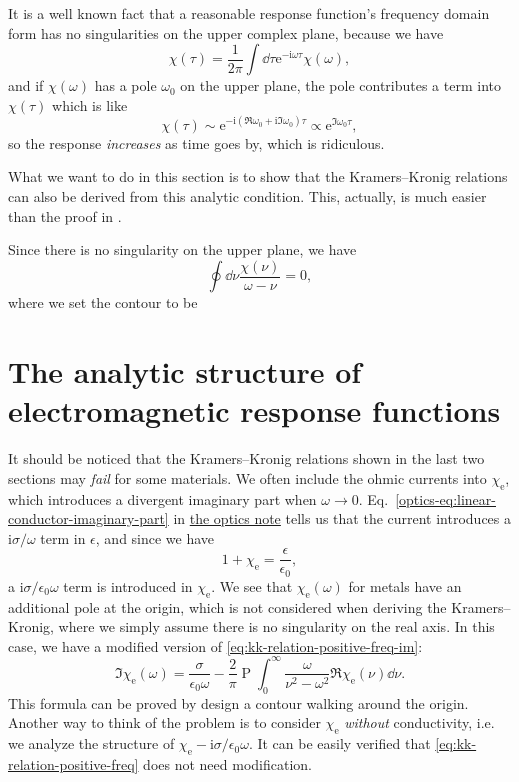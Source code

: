 \documentclass[hyperref, a4paper]{article}
\DeclareMathOperator{\primevalue}{P}
\newcommand*{\ii}{\mathrm{i}}
\newcommand*{\ee}{\mathrm{e}}
\newcommand{\opticsdoc}{\href{../optics/optics}{the optics note}}
\begin{document}
It is a well known fact that a reasonable response function's frequency domain form has no singularities on the upper complex plane, because we have 
\[
    \chi(\tau) = \frac{1}{2\pi} \int \dd{\tau} \ee^{- \ii \omega \tau} \chi(\omega),
\]
and if $\chi(\omega)$ has a pole $\omega_0$ on the upper plane, the pole contributes a term into $\chi(\tau)$ which is like 
\[
    \chi(\tau) \sim \ee^{- \ii (\Re \omega_0 + \ii \Im \omega_0) \tau} \propto \ee^{\Im \omega_0 \tau},
\]
so the response \emph{increases} as time goes by, which is ridiculous.

What we want to do in this section is to show that the Kramers–Kronig relations can also be derived from this analytic condition.
This, actually, is much easier than the proof in .

Since there is no singularity on the upper plane, we have 
\[
    \oint \dd{\nu} \frac{\chi(\nu)}{\omega - \nu} = 0,
\]
where we set the contour to be 

\section{The analytic structure of electromagnetic response functions}

It should be noticed that the Kramers–Kronig relations shown in the last two sections may \emph{fail} for some materials.
We often include the ohmic currents into $\chi_\text{e}$, which introduces a divergent imaginary part when $\omega \to 0$.
Eq.~\eqref{optics-eq:linear-conductor-imaginary-part} in \opticsdoc{} tells us that the current introduces a $\ii \sigma / \omega$ term in $\epsilon$, and since we have 
\begin{equation}
    1 + \chi_\text{e} = \frac{\epsilon}{\epsilon_0},
\end{equation}
a $\ii \sigma / \epsilon_0 \omega$ term is introduced in $\chi_\text{e}$.
We see that $\chi_\text{e}(\omega)$ for metals have an additional pole at the origin, which is not considered when deriving the Kramers–Kronig, where we simply assume there is no singularity on the real axis.
In this case, we have a modified version of \eqref{eq:kk-relation-positive-freq-im}:
\begin{equation}
    \Im \chi_\text{e}(\omega) = \frac{\sigma}{\epsilon_0 \omega} - \frac{2}{\pi} \primevalue \int_0^\infty \frac{\omega}{\nu^2 - \omega^2} \Re \chi_\text{e}(\nu) \dd{\nu}.
    \label{eq:metal-kk-relation}
\end{equation}
This formula can be proved by design a contour walking around the origin.
Another way to think of the problem is to consider $\chi_\text{e}$ \emph{without} conductivity, i.e. we analyze the structure of $\chi_\text{e} - \ii \sigma / \epsilon_0 \omega$.
It can be easily verified that \eqref{eq:kk-relation-positive-freq} does not need modification.
\end{document}
